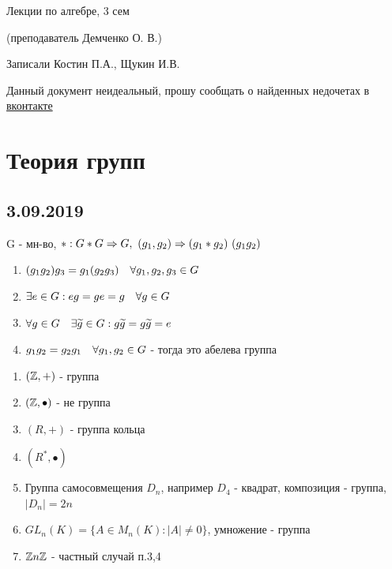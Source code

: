 \documentclass[12pt, fleqn]{article}
\begin{document}
\begin{center}
  \huge Лекции по алгебре, 3 сем

  \Large (преподаватель Демченко О. В.)

  \large Записали Костин П.А., Щукин И.В.
\end{center}

Данный документ неидеальный, прошу сообщать о найденных недочетах в \href{https://vk.com/drab_existence_a}{вконтакте}
\tableofcontents
\newpage

\section{Теория групп}
\subsection{3.09.2019}

\begin{definition}
    G - мн-во, $*:G*G \Rightarrow G,\ (g_1, g_2) \Rightarrow (g_1*g_2)\ (g_1g_2)$
    \begin{enumerate}
    	\item $(g_1g_2)g_3 = g_1(g_2g_3) \quad \forall g_1, g_2, g_3 \in G$
    	\item $\exists e \in G : e g = g e = g \quad \forall g \in G$
    	\item $\forall g \in G \quad \exists \widetilde{g} \in G : g\widetilde{g} = g \widetilde{g} = e$
    	\item $g_1g_2 = g_2g_1 \quad \forall g_1, g_2 \in G$ - тогда это абелева группа
	\end{enumerate}
\end{definition}

\begin{example}
    \begin{enumerate}
        \item $(\mathbb{Z},+)$ - группа
        \item $(\mathbb{Z}, \bullet)$ - не группа
        \item $(R, +)$ - группа кольца
        \item $(R^*, \bullet)$
        \item Группа самосовмещения $D_n$, например $D_4$ - квадрат, композиция - группа, $|D_n|=2n$
        \item $GL_n(K) = \{A \in M_n(K) : |A| \neq 0\}$, умножение - группа
        \item $\mathbb{Z} n \mathbb{Z}$ - частный случай п.3,4
    \end{enumerate}
\end{example}
\end{document}
